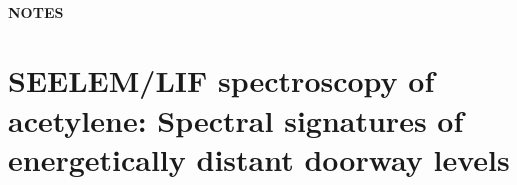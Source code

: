 \documentclass[12pt]{mitthesis}
\newcommand{\TODO} [1]{\textcolor{magenta}{\textbf{TODO:} #1}}
\newcommand{\bigspace}{$
  \;
  $}
\newcommand{\AtoX}{$
  \tilde{A} \: ^1\!A_u 
  \leftarrow 
  \tilde{X} \: ^1\Sigma_g^+
  $}
\newcommand{\StoS}{$
  S_1 \leftarrow S_0
  $}
\begin{document}
\tableofcontents
\clearpage

\listoffigures
\clearpage

\subsubsection*{NOTES}

\clearpage

\setcounter{chapter}{3}
\chapter{SEELEM/LIF spectroscopy of acetylene: Spectral signatures of
  energetically distant doorway levels}



\end{document}
